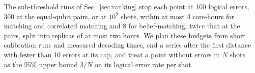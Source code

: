 
The sub-threshold runs of Sec.~\ref{sec:ranking} stop each point at 100 logical errors, 300 at the equal-qubit pairs, or at $10^9$ shots, within at most 4 core-hours for matching and correlated matching and 8 for belief-matching, twice that at the pairs, split into replicas of at most two hours. We plan these budgets from short calibration runs and measured decoding times, end a series after the first distance with fewer than 10 errors at its cap, and treat a point without errors in $N$ shots as the 95\% upper bound $3/N$ on its logical error rate per shot.

